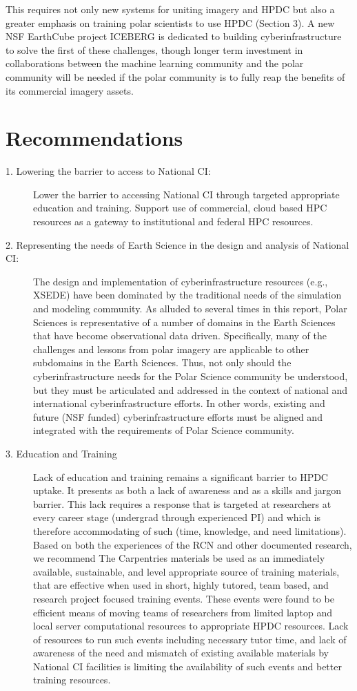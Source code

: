 \documentclass[10pt,letterpaper,draft]{article}
\begin{document}
This requires not only new systems for uniting imagery and HPDC but also a greater emphasis on training polar scientists to use HPDC (Section 3). 
A new NSF EarthCube project ICEBERG is dedicated to building cyberinfrastructure to solve the first of these challenges, though longer term investment in collaborations between the machine learning community and the polar community will be needed if the polar community is to fully reap the benefits of its commercial imagery assets.

\section*{Recommendations}
\begin{description}
  \item[1. Lowering the barrier to access to National CI:]
  Lower the barrier to accessing National CI through targeted appropriate education and training.
Support use of commercial, cloud based HPC resources as a gateway to institutional and federal HPC resources.

\item[2. Representing the needs of Earth Science in the design and analysis of National CI:]
The design and implementation of cyberinfrastructure resources (e.g., XSEDE) have been dominated by the traditional needs of the simulation and modeling community. As alluded to several times in this report, Polar Sciences is representative of a number of domains in the Earth Sciences that have become observational data driven. Specifically, many of the challenges and lessons from polar imagery are applicable to other subdomains in the Earth Sciences. Thus, not only should the cyberinfrastructure needs for the Polar Science community be understood, but they must be articulated and addressed in the context of national and international cyberinfrastructure efforts. In other words, existing and future (NSF funded) cyberinfrastructure efforts must be aligned and integrated with the requirements of Polar Science community.

\item[3. Education and Training ]
Lack of education and training remains a significant barrier to HPDC uptake. It presents as both a lack of awareness and as a skills and jargon barrier. This lack requires a response that is targeted at researchers at every career stage (undergrad through experienced PI) and which is therefore accommodating of such (time, knowledge, and need limitations). Based on both the experiences of the RCN and other documented research, we recommend The Carpentries materials be used as an immediately available, sustainable, and level appropriate source of training materials, that are effective when used in short, highly tutored, team based, and research project focused training events. These events were found to be efficient means of moving teams of researchers from limited laptop and local server computational resources to appropriate HPDC resources. Lack of resources to run such events including necessary tutor time, and lack of awareness of the need and mismatch of existing available materials by National CI facilities is limiting the availability of such events and better training resources.


\end{description}
\end{document}
